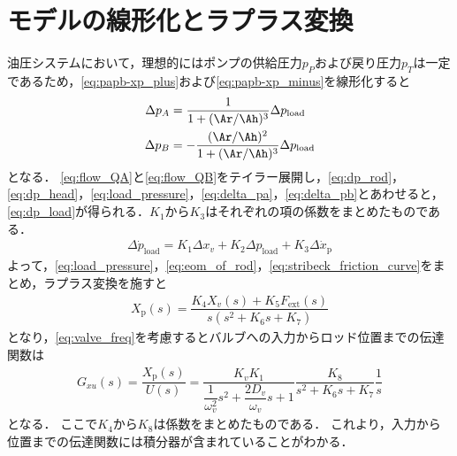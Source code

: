 \section{モデルの線形化とラプラス変換}
油圧システムにおいて，理想的にはポンプの供給圧力$p_P$および戻り圧力$p_T$は一定であるため，\eqnname\ref{eq:papb-xp_plus}および\eqnname\ref{eq:papb-xp_minus}を線形化すると
\begin{align}
    \label{eq:delta_pa}
    \Delta p_A &= \dfrac{1}{1+(\Ar/\Ah)^3} \Delta p_\mathrm{load}\\
    \label{eq:delta_pb}
    \Delta p_B &= -\dfrac{(\Ar/\Ah)^2}{1+(\Ar/\Ah)^3} \Delta p_\mathrm{load}
\end{align}
となる．
\eqnname\ref{eq:flow_QA}と\eqnname\ref{eq:flow_QB}をテイラー展開し，\eqnname\ref{eq:dp_rod}，\eqnname\ref{eq:dp_head}，\eqnname\ref{eq:load_pressure}，\eqnname\ref{eq:delta_pa}，\eqnname\ref{eq:delta_pb}とあわせると，\eqnname\ref{eq:dp_load}が得られる．$K_1$から$K_3$はそれぞれの項の係数をまとめたものである．
\begin{align}
    \label{eq:dp_load}
    \Delta \dot{p}_\mathrm{load} = K_1 \Delta x_v +K_2 \Delta p_\mathrm{load} +K_3 \Delta \dot{x}_\mathrm{p}
\end{align}
よって，\eqnname\ref{eq:load_pressure}，\eqnname\ref{eq:eom_of_rod}，\eqnname\ref{eq:stribeck_friction_curve}をまとめ，ラプラス変換を施すと
\begin{align}
    \label{eq:lhapras}
    X_\mathrm{p}(s) = \dfrac{K_4 X_v(s)+K_5 F_\mathrm{ext}(s)}{s(s^2 + K_6s + K_7)}
\end{align}
となり，\eqnname\ref{eq:valve_freq}を考慮するとバルブへの入力からロッド位置までの伝達関数は
\begin{align}
    \label{eq:tf_Gxu}
    G_{xu}(s) = \dfrac{X_\mathrm{p}(s)}{U(s)} = \dfrac{K_vK_1}{\dfrac{1}{\omega_v^2}s^2 + \dfrac{2D_v}{\omega_v}s + 1} \dfrac{K_8}{s^2 + K_6s + K_7} \dfrac{1}{s}
\end{align}
となる．
ここで$K_4$から$K_8$は係数をまとめたものである．
これより，入力から位置までの伝達関数には積分器が含まれていることがわかる．

